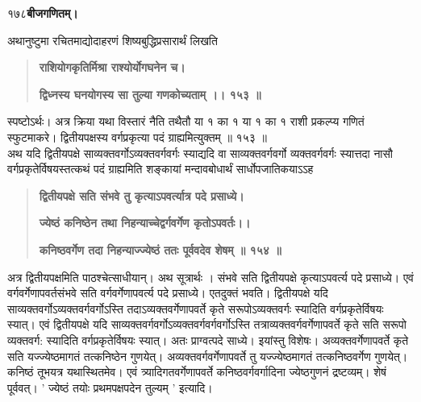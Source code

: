 \documentclass[11pt, openany]{book}
\begin{document}
\onehalfspacing
१७८\hspace{2in}\textbf{बीजगणितम्।} 

\vspace{5mm}

\begin{sloppypar}
\hangindent=0.2in \hspace{0.2in}अथानुष्टुमा रचितमाद्योदाहरणं शिष्यबुद्धिप्रसारार्थं लिखति\textendash

\begin{quote}
\hspace{1in}\textbf{राशियोगकृतिर्मिश्रा राश्योर्योगघनेन च।}

\hspace{1in}\textbf{द्विध्नस्य घनयोगस्य सा तुल्या गणकोच्यताम् ।। १५३ ॥}
\end{quote}

\hangindent=0.2in \hspace{0.2in}स्पष्टोऽर्थः। अत्र क्रिया यथा विस्तारं नैति तथैतौ या १ का १ या १ का १ राशी प्रकल्प्य गणितं स्फुटमाकरे। द्वितीयपक्षस्य वर्गप्रकृत्या पदं ग्राह्यमित्युक्तम् ॥ १५३ ॥\\

\hangindent=0.2in \hspace{0.2in}अथ यदि द्वितीयपक्षे साव्यक्तवर्गोऽव्यक्तवर्गवर्गः स्याद्यदि वा साव्यक्तवर्गवर्गो व्यक्तवर्गवर्गः स्यात्तदा नासौ वर्गप्रकृतेर्विषयस्तत्कथं पदं ग्राह्यमिति शङ्कायां मन्दावबोधार्थं सार्धोपजातिकयाऽऽह\textendash

\begin{quote}
\hspace{1in}\textbf{द्वितीयपक्षे सति संभवे तु कृत्याऽपवर्त्यात्र पदे प्रसाध्ये।}

\hspace{0.5in}\textbf{ज्येष्ठं कनिष्ठेन तथा निहन्याच्चेद्वर्गवर्गेण कृतोऽपवर्तः।।}

\hspace{0.5in}\textbf{कनिष्ठवर्गेण तदा निहन्याज्ज्येष्ठं ततः पूर्ववदेव शेषम् ॥ १५४ ॥}
\end{quote}

\hangindent=0.2in \hspace{0.2in}अत्र द्वितीयपक्षमिति पाठश्चेत्साधीयान्। अथ सूत्रार्थः । संभवे सति द्वितीयपक्षे कृत्याऽपवर्त्य पदे प्रसाध्ये। एवं वर्गवर्गेणापवर्तसंभवे सति वर्गवर्गेणापवर्त्य पदे प्रसाध्ये। एतदुक्तं भवति। द्वितीयपक्षे यदि साव्यक्तवर्गोऽव्यक्तवर्गवर्गोऽस्ति तदाऽव्यक्तवर्गेणापवर्ते कृते सरूपोऽव्यक्तवर्गः स्यादिति वर्गप्रकृतेर्विषयः स्यात्। एवं द्वितीयपक्षे यदि साव्यक्तवर्गवर्गोऽव्यक्तवर्गवर्गवर्गोऽस्ति तत्राव्यक्तवर्गवर्गेणापवर्ते कृते सति सरूपो व्यक्तवर्ग: स्यादिति वर्गप्रकृतेर्विषयः स्यात्। अतः प्राग्वत्पदे साध्ये। इयांस्तु विशेषः। अव्यक्तवर्गेणापवर्ते कृते सति यज्ज्येष्ठमागतं तत्कनिष्ठेन गुणयेत्। अव्यक्तवर्गवर्गेणापवर्ते तु यज्ज्येष्ठमागतं तत्कनिष्ठवर्गेण गुणयेत्। कनिष्ठं तूभयत्र यथास्थितमेव। एवं त्र्यादिगतवर्गेणापवर्ते कनिष्ठवर्गवर्गादिना ज्येष्ठगुणनं द्रष्टव्यम्। शेषं पूर्ववत्। ' ज्येष्ठं तयोः प्रथमपक्षपदेन तुल्यम् ' इत्यादि।\\


\end{sloppypar}
\end{document}
